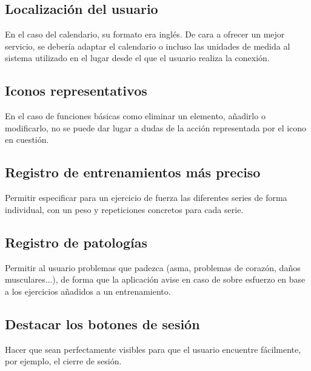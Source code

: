 \documentclass[a4paper]{article}
\begin{document}
	\subsection{Localización del usuario}
	
	En el caso del calendario, su formato era inglés. De cara a ofrecer un mejor servicio, se debería adaptar el calendario o incluso las unidades de medida al sistema utilizado en el lugar desde el que el usuario realiza la conexión.
	
	\subsection{Iconos representativos}
	
	En el caso de funciones básicas como eliminar un elemento, añadirlo o modificarlo, no se puede dar lugar a dudas de la acción representada por el icono en cuestión.
	
	\subsection{Registro de entrenamientos más preciso}
	
	Permitir especificar para un ejercicio de fuerza las diferentes series de forma individual, con un peso y repeticiones concretos para cada serie.
	
	\subsection{Registro de patologías}
	
	Permitir al usuario problemas que padezca (asma, problemas de corazón, daños musculares...), de forma que la aplicación avise en caso de sobre esfuerzo en base a los ejercicios añadidos a un entrenamiento.
	
	\subsection{Destacar los botones de sesión}
	
	Hacer que sean perfectamente visibles para que el usuario encuentre fácilmente, por ejemplo, el cierre de sesión.
\end{document}

